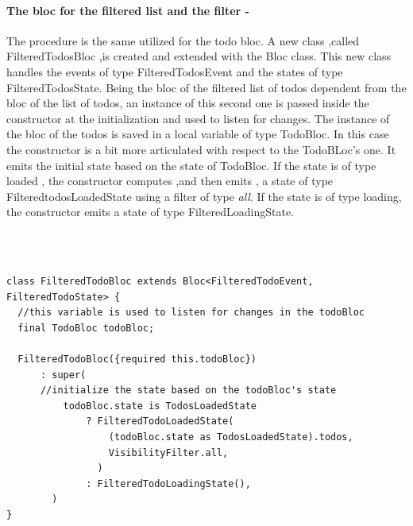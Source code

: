 \paragraph{The bloc for the filtered list and the filter - }
\label{subpar:todo_app_bloc_core_state}
The procedure is the same utilized for the todo bloc. A new class ,called FilteredTodosBloc ,is created and extended with the Bloc class. This new class handles the events of type FilteredTodosEvent and the states of type FilteredTodosState. Being the bloc of the filtered list of todos dependent from the bloc of the list of todos, an instance of this second one is passed inside the constructor at the initialization and used to listen for changes.
The instance of the bloc of the todos is saved in a local variable of type TodoBloc. In this case the constructor is a bit more articulated with respect to the TodoBLoc's one. It emits the initial state based on the state of TodoBloc. If the state is of type loaded , the constructor computes ,and then emits , a state of type FilteredtodosLoadedState using a filter of type \textit{all}. If the state is of type loading, the constructor emits a state of type FilteredLoadingState.
\begin{code}
\mbox{}\\
 \mbox{}
\label{code:2.14}
\begin{verbatim}

class FilteredTodoBloc extends Bloc<FilteredTodoEvent, FilteredTodoState> {
  //this variable is used to listen for changes in the todoBloc
  final TodoBloc todoBloc;

  FilteredTodoBloc({required this.todoBloc})
      : super(
      //initialize the state based on the todoBloc's state
          todoBloc.state is TodosLoadedState
              ? FilteredTodoLoadedState(
                  (todoBloc.state as TodosLoadedState).todos,
                  VisibilityFilter.all,
                )
              : FilteredTodoLoadingState(),
        )  
}
\end{verbatim}
\mbox{}
\end{code}

